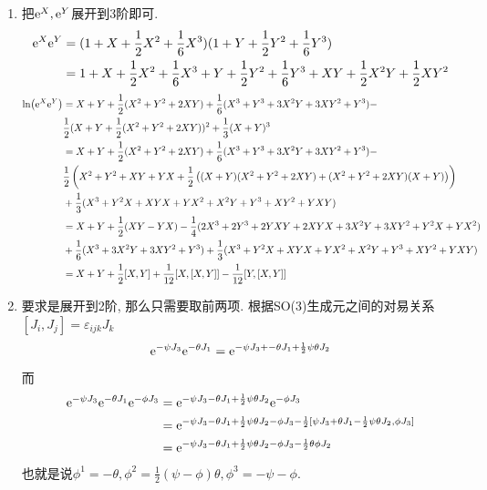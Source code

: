 \begin{solution}
    \begin{enumerate}[label=(\arabic*)]
        \item 把$\mathrm e^{X},\mathrm e^{Y}$展开到3阶即可. 
            \begin{align*}
                \mathrm e^{X}\mathrm e^{Y}&=(1+X+\frac12X^2+\frac16X^3)(1+Y+\frac12Y^2+\frac16Y^3)\\&=
                1+X+\frac12X^2+\frac16X^3+Y+\frac12Y^2+\frac16Y^3+XY+\frac12X^2Y+\frac12XY^2
            \end{align*}
            \begin{align*}
                \ln(\mathrm e^{X}\mathrm e^{Y})&=X+Y+\frac12(X^2+Y^2+2XY)+\frac16(X^3+Y^3+3X^2Y+3XY^2+Y^3)-\\&\frac12(X+Y+\frac12(X^2+Y^2+2XY))^2+\frac13(X+Y)^3\\&=X+Y+\frac12(X^2+Y^2+2XY)+\frac16(X^3+Y^3+3X^2Y+3XY^2+Y^3)-\\&\frac12\left(X^2+Y^2+XY+YX+\frac12\left((X+Y)(X^2+Y^2+2XY)+(X^2+Y^2+2XY)(X+Y)\right)\right)\\&+\frac13(X^3+Y^2X+XYX+YX^2+X^2Y+Y^3+XY^2+YXY)\\&=X+Y+\frac12(XY-YX)-\frac14(2X^3+2Y^3+2YXY+2XYX+3X^2Y+3XY^2+Y^2X+YX^2)\\&+\frac16(X^3+3X^2Y+3XY^2+Y^3)+\frac13(X^3+Y^2X+XYX+YX^2+X^2Y+Y^3+XY^2+YXY)\\&=X+Y+\frac{1}{2}[X,Y]+\frac{1}{12}[X,[X,Y]]-\frac{1}{12}[Y,[X,Y]]
            \end{align*}
        \item 要求是展开到2阶, 那么只需要取前两项. 
        根据SO(3)生成元之间的对易关系$[J_i,J_j]=\varepsilon_{ijk}J_k$
        $$\mathrm e^{-\psi J_3}\mathrm e^{-\theta J_1}=\mathrm e^{-\psi J_3+-\theta J_1+\frac12\psi\theta J_2}$$
        而
        \begin{align*}
            \mathrm e^{-\psi J_3}\mathrm e^{-\theta J_1}\mathrm e^{-\phi J_3}&=\mathrm e^{-\psi J_3-\theta J_1+\frac12\psi\theta J_2}\mathrm e^{-\phi J_3}\\&=\mathrm e^{-\psi J_3-\theta J_1+\frac12\psi\theta J_2-\phi J_3-\frac12[\psi J_3+\theta J_1-\frac12\psi\theta J_2, \phi J_3]}\\&=\mathrm e^{-\psi J_3-\theta J_1+\frac12\psi\theta J_2-\phi J_3-\frac12\theta\phi J_2}
        \end{align*}
        也就是说$\phi^1=-\theta,\phi^2=\frac{1}{2}(\psi-\phi)\theta,\phi^3=-\psi-\phi$.
    \end{enumerate}
\end{solution}

